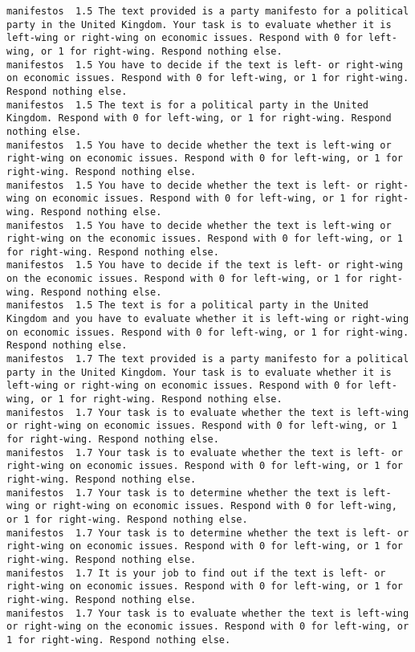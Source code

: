 \begin{lstlisting}[label=lst:promptvariants]
manifestos	1.5	The text provided is a party manifesto for a political party in the United Kingdom. Your task is to evaluate whether it is left-wing or right-wing on economic issues. Respond with 0 for left-wing, or 1 for right-wing. Respond nothing else.
manifestos	1.5	You have to decide if the text is left- or right-wing on economic issues. Respond with 0 for left-wing, or 1 for right-wing. Respond nothing else.
manifestos	1.5	The text is for a political party in the United Kingdom. Respond with 0 for left-wing, or 1 for right-wing. Respond nothing else.
manifestos	1.5	You have to decide whether the text is left-wing or right-wing on economic issues. Respond with 0 for left-wing, or 1 for right-wing. Respond nothing else.
manifestos	1.5	You have to decide whether the text is left- or right-wing on economic issues. Respond with 0 for left-wing, or 1 for right-wing. Respond nothing else.
manifestos	1.5	You have to decide whether the text is left-wing or right-wing on the economic issues. Respond with 0 for left-wing, or 1 for right-wing. Respond nothing else.
manifestos	1.5	You have to decide if the text is left- or right-wing on the economic issues. Respond with 0 for left-wing, or 1 for right-wing. Respond nothing else.
manifestos	1.5	The text is for a political party in the United Kingdom and you have to evaluate whether it is left-wing or right-wing on economic issues. Respond with 0 for left-wing, or 1 for right-wing. Respond nothing else.
manifestos	1.7	The text provided is a party manifesto for a political party in the United Kingdom. Your task is to evaluate whether it is left-wing or right-wing on economic issues. Respond with 0 for left-wing, or 1 for right-wing. Respond nothing else.
manifestos	1.7	Your task is to evaluate whether the text is left-wing or right-wing on economic issues. Respond with 0 for left-wing, or 1 for right-wing. Respond nothing else.
manifestos	1.7	Your task is to evaluate whether the text is left- or right-wing on economic issues. Respond with 0 for left-wing, or 1 for right-wing. Respond nothing else.
manifestos	1.7	Your task is to determine whether the text is left-wing or right-wing on economic issues. Respond with 0 for left-wing, or 1 for right-wing. Respond nothing else.
manifestos	1.7	Your task is to determine whether the text is left- or right-wing on economic issues. Respond with 0 for left-wing, or 1 for right-wing. Respond nothing else.
manifestos	1.7	It is your job to find out if the text is left- or right-wing on economic issues. Respond with 0 for left-wing, or 1 for right-wing. Respond nothing else.
manifestos	1.7	Your task is to evaluate whether the text is left-wing or right-wing on the economic issues. Respond with 0 for left-wing, or 1 for right-wing. Respond nothing else.

\end{lstlisting}
